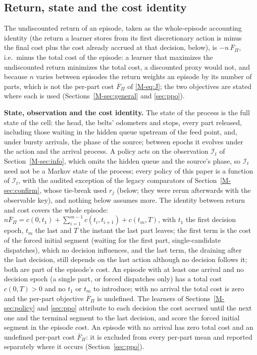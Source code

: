 \documentclass[11pt,a4paper]{article}
\theoremstyle{plain}
\theoremstyle{definition}
\theoremstyle{remark}
\newcommand{\Fpi}{\overline F_\Pi}
\newcommand{\I}{\mathcal I}
\begin{document}
\subsection{Return, state and the cost identity}
The undiscounted return of an
episode, taken as the whole-episode accounting identity (the return a learner stores
from its first discretionary action is minus the final cost plus the cost already accrued
at that decision, below), is $-n\,\Fpi$, i.e.\ minus the total cost of the episode: a learner that
maximizes the undiscounted return minimizes the total cost, a discounted proxy would
not, and because $n$ varies between episodes the return weights an episode by its
number of parts, which is not the per-part cost $\Fpi$ of \eqref{M-eq:J}; the two
objectives are stated where each is used (Sections~\ref{M-sec:general} and
\ref{sec:ppo}).

\textbf{State, observation and the cost identity.} The state of the process is the full
state of the cell: the head, the belts' odometers and stops, every part released,
including those waiting in the hidden queue upstream of the feed point, and, under
bursty arrivals, the phase of the source; between epochs it evolves under the action and
the arrival process. A policy acts on the observation $\I_t$ of Section~\ref{M-sec:info},
which omits the hidden queue and the source's phase, so $\I_t$ need not be a Markov
state of the process; every policy of this paper is a function of $\I_t$, with the
audited exception of the legacy comparators of Section~\ref{M-sec:confirm}, whose
tie-break used $r_j$ (below; they were rerun afterwards with the observable key), and nothing below assumes more. The identity between return and cost covers the whole episode:
$n\Fpi=c(0,t_1)+\sum_{i=1}^{m-1}c(t_i,t_{i+1})+c(t_m,T)$, with $t_1$ the first decision
epoch, $t_m$ the last and $T$ the instant the last part leaves; the first term is the
cost of the forced initial segment (waiting for the first part, single-candidate
dispatches), which no decision influences, and the last term, the draining after the
last decision, still depends on the last action although no decision follows it; both
are part of the episode's cost. An episode with at least one arrival and no decision
epoch (a single part, or forced dispatches only) has a total cost $c(0,T)>0$ and no $t_1$
or $t_m$ to introduce; with no arrival the total cost is zero and the per-part objective
$\Fpi$ is undefined. The learners of Sections~\ref{M-sec:policy} and \ref{sec:ppo} attribute
to each decision the cost accrued until the next one and the terminal segment to the
last decision, and score the forced initial segment in the episode cost. An episode
with no arrival has zero total cost and an undefined per-part cost $\Fpi$: it is
excluded from every per-part mean and reported separately where it occurs
(Section~\ref{sec:ppo}).
\end{document}
